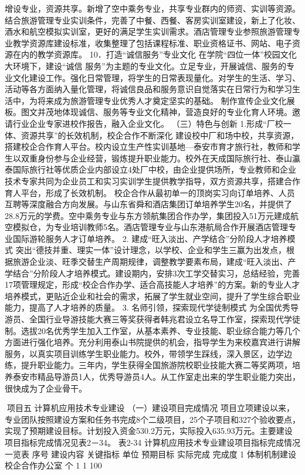 增设专业，资源共享。新增了空中乘务专业，共享专业群内的师资、实训等资源。结合旅游管理专业实训条件，完善了中餐、西餐、客房实训室建设，新上了化妆、酒水和航空模拟实训室，更好的满足学生实训需求。酒店管理专业参照旅游管理专业教学资源库建设标准，收集整理了包括课程标准、职业资格证书、网站、电子资源在内的教学资源库。
10．打造“诚信服务”专业文化
在学院“四位一体”校园文化大环境下，建设“诚信 服务”为主题的专业文化。立足专业，开展诚信、服务的专业文化建设工作。强化日常管理，将学生的日常表现量化。对学生的生活、学习、活动等各方面纳入量化管理，将诚信良品和服务意识自觉落实在日常行为和学习生活中，为将来成为旅游管理专业优秀人才奠定坚实的基础。
制作宣传企业文化展板。图文并茂地体现诚信、服务等专业文化精神，营造良好的专业化育人环境。邀请行业企业专家进校作报告，融入企业文化。
（三）特色与创新
1.形成“厂校一体、资源共享”的长效机制，校企合作不断深化
建设校中厂和场中校，共享资源，搭建校企合作育人平台。校内设立生产性实训基地—泰安市育才旅行社，教师和学生以双重身份参与企业经营，锻炼提升职业能力。校外在天成国际旅行社、泰山瀛泰国际旅行社等优质企业内部设立4处厂中校，由企业提供场所，专业教师和企业技术专家共同为企业员工和实习实训学生提供教学指导，双方资源共享，搭建合作育人平台，形成了长效机制。
校企合作从最初单一的顶岗实习向订单培养、人员互聘等深度融合方向发展。与山东省舜和酒店集团订单培养学生20名，并提供了28.8万元的学费。空中乘务专业与东方领航集团合作办学，集团投入51万元建成航空模拟仓，为专业培训教师5名。酒店管理专业与山东港航局合作开展酒店管理专业国际游轮服务人才订单培养。
2. 建成“旺入淡出、产学结合”分阶段人才培养模式
突出“德技并重、理实一体”设计理念，以学校、企业和学生三赢为出发点，根据旅游企业淡、旺季交替生产周期规律，调整教学要素布局，建成“旺入淡出、产学结合”分阶段人才培养模式。建设期内，安排3次工学交替实习，总结经验，完善17项管理规定，形成“校企合作办学、适合高技能人才培养”的方案。新的专业人才培养模式，更贴近企业和社会的需求，拓展了学生就业空间，提升了学生综合职业能力，提高了人才培养的质量。
3. 名师引领，探索现代学徒制模式
为全国优秀导游员、全国行业导游技能大赛三等奖获得者韩兆君设立名导工作室，探索现代学徒制。选拔20名优秀学生加入工作室，从基本素养、专业技能、职业综合能力等几个方面进行强化培养。充分利用泰山书院提供的机会，指导学生为来校嘉宾进行讲解服务，以真实项目训练学生职业能力。校外，带领学生踩线，深入景区，边学边练，提升职业能力。三年内，学生获得全国旅游院校职业技能大赛二等奖两项，培养泰安市精品导游员1人，优秀导游员4人。从工作室走出来的学生职业能力突出，很快成为了企业骨干。

项目五   计算机应用技术专业建设
（一）建设项目完成情况
项目立项建设以来，专业团队按照建设方案和任务书完成8个二级项目，25个子项目和327个验收要点，实现了预期建设目标。计划投入资金530.2万元，实际投入635.93万元。主要建设项目指标完成情况见表2－34。
表2-34  计算机应用技术专业建设项目指标完成情况一览表
序号
建设内容
关键指标
单位
预期目标
实际完成
完成度
1
体制机制建设
校企合作办公室
个
1
1
100%



